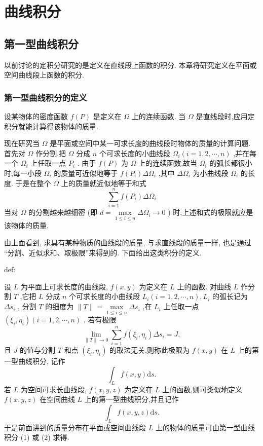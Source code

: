 \chapter{曲线积分}

\section{第一型曲线积分}

以前讨论的定积分研究的是定义在直线段上函数的积分. 本章将研究定义在平面或空间曲线段上函数的积分.

\subsection{第一型曲线积分的定义}

设某物体的密度函数 \(f\left( P\right)\) 是定义在 \(\Omega\) 上的连续函数. 当 \(\Omega\) 是直线段时,应用定积分就能计算得该物体的质量.

现在研究当 \(\Omega\) 是平面或空间中某一可求长度的曲线段时物体的质量的计算问题. 首先对 \(\Omega\) 作分割,把 \(\Omega\) 分成 \(n\) 个可求长度的小曲线段 \({\Omega }_{i}\left( {i = 1,2,\cdots ,n}\right)\) ,并在每一个 \({\Omega }_{i}\) 上任取一点 \({P}_{i}\) . 由于 \(f\left( P\right)\) 为 \(\Omega\) 上的连续函数,故当 \({\Omega }_{i}\) 的弧长都很小时,每一小段 \({\Omega }_{i}\) 的质量可近似地等于 \(f\left( {P}_{i}\right) \Delta {\Omega }_{i}\) ,其中 \(\Delta {\Omega }_{i}\) 为小曲线段 \({\Omega }_{i}\) 的长度. 于是在整个 \(\Omega\) 上的质量就近似地等于和式
\[
\mathop{\sum }\limits_{{i = 1}}^{n}f\left( {P}_{i}\right) \Delta {\Omega }_{i}
\]
当对 \(\Omega\) 的分割越来越细密 (即 \(d = \mathop{\max }\limits_{{1 \leq  i \leq  n}}\Delta {\Omega }_{i} \rightarrow  0\) ) 时,上述和式的极限就应是该物体的质量.

由上面看到, 求具有某种物质的曲线段的质量, 与求直线段的质量一样, 也是通过 “分割、近似求和、取极限”来得到的. 下面给出这类积分的定义.

\begin{definition}{}{def:}

\end{definition}
设 \(L\) 为平面上可求长度的曲线段, \(f\left( {x,y}\right)\) 为定义在 \(L\) 上的函数. 对曲线 \(L\) 作分割 \(T\) ,它把 \(L\) 分成 \(n\) 个可求长度的小曲线段 \({L}_{i}\left( {i = 1,2,\cdots ,n}\right) ,{L}_{i}\) 的弧长记为 \(\Delta {s}_{i}\) , 分割 \(T\) 的细度为 \(\parallel T\parallel  = \mathop{\max }\limits_{{1 \leq  i \leq  n}}\Delta {s}_{i}\) ,在 \({L}_{i}\) 上任取一点 \(\left( {{\xi }_{i},{\eta }_{i}}\right) \left( {i = 1,2,\cdots ,n}\right)\) . 若有极限
\[
\mathop{\lim }\limits_{{\parallel T\parallel  \rightarrow  0}}\mathop{\sum }\limits_{{i = 1}}^{n}f\left( {{\xi }_{i},{\eta }_{i}}\right) \Delta {s}_{i} = J,
\]
且 \(J\) 的值与分割 \(T\) 和点 \(\left( {{\xi }_{i},{\eta }_{i}}\right)\) 的取法无关,则称此极限为 \(f\left( {x,y}\right)\) 在 \(L\) 上的第一型曲线积分, 记作
\[
{\int }_{L}f\left( {x,y}\right) \mathrm{d}s. \tag{1}
\]
若 \(L\) 为空间可求长曲线段, \(f\left( {x,y,z}\right)\) 为定义在 \(L\) 上的函数,则可类似地定义 \(f\left( {x,y,z}\right)\) 在空间曲线 \(L\) 上的第一型曲线积分,并且记作
\[
{\int }_{L}f\left( {x,y,z}\right) \mathrm{d}s. \tag{2}
\]
于是前面讲到的质量分布在平面或空间曲线段 \(L\) 上的物体的质量可由第一型曲线积分 (1) 或 (2) 求得.

